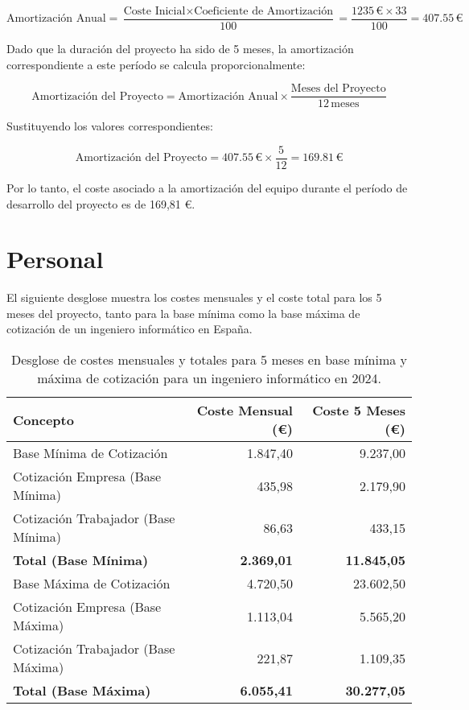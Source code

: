 \[
\text{Amortización Anual} = \frac{\text{Coste Inicial} \times \text{Coeficiente de Amortización}}{100} = \frac{1235 \, \text{€} \times 33}{100} = 407.55 \, \text{€}
\]

Dado que la duración del proyecto ha sido de 5 meses, la amortización correspondiente a este período se calcula proporcionalmente:

\[
\text{Amortización del Proyecto} = \text{Amortización Anual} \times \frac{\text{Meses del Proyecto}}{12 \, \text{meses}}
\]

Sustituyendo los valores correspondientes:

\[
\text{Amortización del Proyecto} = 407.55 \, \text{€} \times \frac{5}{12} = 169.81 \, \text{€}
\]

Por lo tanto, el coste asociado a la amortización del equipo durante el período de desarrollo del proyecto es de 169,81 €.

\section{Personal}
El siguiente desglose muestra los costes mensuales y el coste total para los 5 meses del proyecto, tanto para la base mínima como la base máxima de cotización de un ingeniero informático en España\cite{cotizacion}.

\begin{table}[h!]
    \centering
    \begin{tabular}{lrr}
        \toprule
        \textbf{Concepto} & \textbf{Coste Mensual (€)} & \textbf{Coste 5 Meses (€)} \\
        \midrule
        Base Mínima de Cotización & 1.847,40 & 9.237,00 \\
        Cotización Empresa (Base Mínima) & 435,98 & 2.179,90 \\
        Cotización Trabajador (Base Mínima) & 86,63 & 433,15 \\
        \textbf{Total (Base Mínima)} & \textbf{2.369,01} & \textbf{11.845,05} \\
        \midrule
        Base Máxima de Cotización & 4.720,50 & 23.602,50 \\
        Cotización Empresa (Base Máxima) & 1.113,04 & 5.565,20 \\
        Cotización Trabajador (Base Máxima) & 221,87 & 1.109,35 \\
        \textbf{Total (Base Máxima)} & \textbf{6.055,41} & \textbf{30.277,05} \\
        \bottomrule
    \end{tabular}
    \caption{Desglose de costes mensuales y totales para 5 meses en base mínima y máxima de cotización para un ingeniero informático en 2024.}
    \end{table}
        
